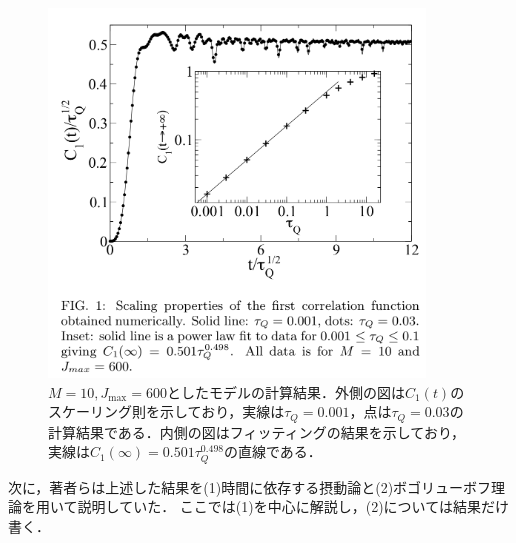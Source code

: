 \documentclass[a4paper,11pt]{jsarticle}
\begin{document}
\begin{figure}[htbp]
  \centering
  \includegraphics[width=10cm]{SSP3_1.png}
  \caption{$M=10, J_{\mathrm{max}}=600$としたモデルの計算結果．外側の図は$C_1(t)$のスケーリング則を示しており，実線は$\tau_Q=0.001$，点は$\tau_Q=0.03$の計算結果である．内側の図はフィッティングの結果を示しており，実線は$C_1(\infty) = 0.501\tau_Q^{0.498}$の直線である．}
  \label{fig:paper_1}
\end{figure}

次に，著者らは上述した結果を(1)時間に依存する摂動論と(2)ボゴリューボフ理論を用いて説明していた．
ここでは(1)を中心に解説し，(2)については結果だけ書く．
\end{document}

